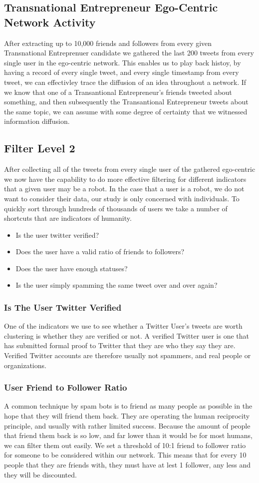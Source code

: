 \subsection{Transnational Entrepreneur Ego-Centric Network Activity}
After extracting up to 10,000 friends and followers from every given Transnational Entreprenuer candidate we gathered the last 200 tweets from every single user in the ego-centric network. This enables us to play back histoy, by having a record of every single tweet, and every single timestamp from every tweet, we can effectivley trace the diffusion of an idea throughout a network. If we know that one of a Transantional Entrepreneur's friends tweeted about something, and then subsequently the Transantional Entrepreneur tweets about the same topic, we can assume with some degree of certainty that we witnessed information diffusion.

\subsection{Filter Level 2}
After collecting all of the tweets from every single user of the gathered ego-centric we now have the capability to do more effective filtering for different indicators that a given user may be a robot. In the case that a user is a robot, we do not want to consider their data, our study is only concerned with individuals. To quickly sort through hundreds of thousands of users we take a number of shortcuts that are indicators of humanity.
\begin{itemize}
\item Is the user twitter verified?
\item Does the user have a valid ratio of friends to followers?
\item Does the user have enough statuses?
\item Is the user simply spamming the same tweet over and over again?
\end{itemize}
\subsubsection{Is The User Twitter Verified}
One of the indicators we use to see whether a Twitter User's tweets are worth clustering is whether they are verified or not. A verified Twitter user is one that has submitted formal proof to Twitter that they are who they say they are. Verified Twitter accounts are therefore usually not spammers, and real people or organizations.
\subsubsection{User Friend to Follower Ratio}
A common technique by spam bots is to friend as many people as possible in the hope that they will friend them back. They are operating the human reciprocity principle, and usually with rather limited success. Because the amount of people that friend them back is so low, and far lower than it would be for most humans, we can filter them out easily. We set a threshold of 10:1 friend to follower ratio for someone to be considered within our network. This means that for every 10 people that they are friends with, they must have at lest 1 follower, any less and they will be discounted.
